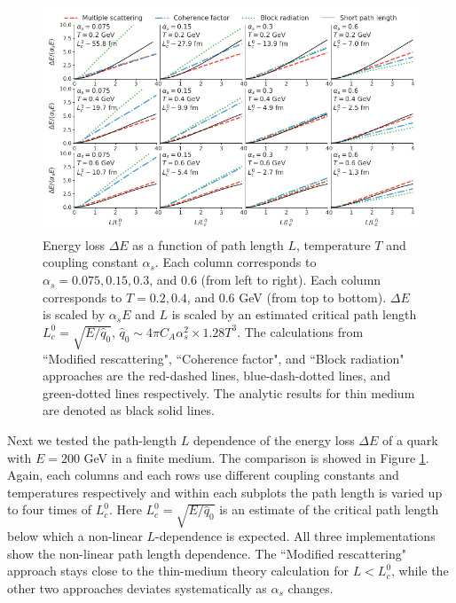 \documentclass[aps, prc, reprint, amsmath, groupedaddress, nofootinbib]{revtex4-1}
\begin{document}
\begin{figure}
\includegraphics[width=\textwidth]{Eloss_Ldep.pdf}
\caption{Energy loss $\Delta E$ as a function of path length $L$, temperature $T$ and coupling constant $\alpha_s$. Each column corresponds to $\alpha_s = 0.075, 0.15, 0.3$, and $0.6$ (from left to right). Each column corresponds to $T = 0.2, 0.4$, and $0.6$ GeV (from top to bottom). $\Delta E$ is scaled by $\alpha_s E$ and $L$ is scaled by an estimated critical path length $L_c^0 = \sqrt{E/\hat{q}_0}$, $\hat{q}_0\sim 4\pi C_A\alpha_s^2 \times 1.28 T^3$. The calculations from ``Modified rescattering", ``Coherence factor", and ``Block radiation" approaches are the red-dashed lines, blue-dash-dotted lines, and green-dotted lines respectively. The analytic results for thin medium are denoted as black solid lines.}
\label{fig:eloss-ldep}
\end{figure}

Next we tested the path-length $L$ dependence of the energy loss $\Delta E$ of a quark with $E = 200$ GeV in a finite medium.
The comparison is showed in Figure \ref{fig:eloss-ldep}.
Again, each columns and each rows use different coupling constants and temperatures respectively and within each subplots the path length is varied up to four times of $L_c^0$.
Here $L_c^0 = \sqrt{E/\hat{q}_0}$ is an estimate of the critical path length below which a non-linear $L$-dependence is expected.
All three implementations show the non-linear path length dependence.
The ``Modified rescattering" approach stays close to the thin-medium theory calculation for $L<L_c^0$, while the other two approaches deviates systematically as $\alpha_s$ changes.
\end{document}
